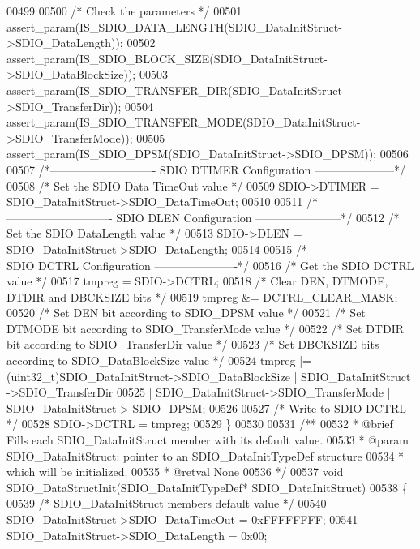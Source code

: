 \begin{DoxyCode}
00499 
00500   \textcolor{comment}{/* Check the parameters */}
00501   assert_param(IS\_SDIO\_DATA\_LENGTH(SDIO\_DataInitStruct->SDIO\_DataLength));
00502   assert_param(IS\_SDIO\_BLOCK\_SIZE(SDIO\_DataInitStruct->SDIO\_DataBlockSize));
00503   assert_param(IS\_SDIO\_TRANSFER\_DIR(SDIO\_DataInitStruct->SDIO\_TransferDir));
00504   assert_param(IS\_SDIO\_TRANSFER\_MODE(SDIO\_DataInitStruct->SDIO\_TransferMode));
00505   assert_param(IS\_SDIO\_DPSM(SDIO\_DataInitStruct->SDIO\_DPSM));
00506 
00507 \textcolor{comment}{/*---------------------------- SDIO DTIMER Configuration ---------------------*/}
00508   \textcolor{comment}{/* Set the SDIO Data TimeOut value */}
00509   SDIO->DTIMER = SDIO\_DataInitStruct->SDIO\_DataTimeOut;
00510 
00511 \textcolor{comment}{/*---------------------------- SDIO DLEN Configuration -----------------------*/}
00512   \textcolor{comment}{/* Set the SDIO DataLength value */}
00513   SDIO->DLEN = SDIO\_DataInitStruct->SDIO\_DataLength;
00514 
00515 \textcolor{comment}{/*---------------------------- SDIO DCTRL Configuration ----------------------*/}
00516   \textcolor{comment}{/* Get the SDIO DCTRL value */}
00517   tmpreg = SDIO->DCTRL;
00518   \textcolor{comment}{/* Clear DEN, DTMODE, DTDIR and DBCKSIZE bits */}
00519   tmpreg &= DCTRL_CLEAR_MASK;
00520   \textcolor{comment}{/* Set DEN bit according to SDIO\_DPSM value */}
00521   \textcolor{comment}{/* Set DTMODE bit according to SDIO\_TransferMode value */}
00522   \textcolor{comment}{/* Set DTDIR bit according to SDIO\_TransferDir value */}
00523   \textcolor{comment}{/* Set DBCKSIZE bits according to SDIO\_DataBlockSize value */}
00524   tmpreg |= (uint32\_t)SDIO\_DataInitStruct->SDIO_DataBlockSize | SDIO\_DataInitStruct
      ->SDIO_TransferDir
00525            | SDIO\_DataInitStruct->SDIO_TransferMode | SDIO\_DataInitStruct->
      SDIO_DPSM;
00526 
00527   \textcolor{comment}{/* Write to SDIO DCTRL */}
00528   SDIO->DCTRL = tmpreg;
00529 \}
00530 
00531 \textcolor{comment}{/**}
00532 \textcolor{comment}{  * @brief  Fills each SDIO\_DataInitStruct member with its default value.}
00533 \textcolor{comment}{  * @param  SDIO\_DataInitStruct: pointer to an SDIO\_DataInitTypeDef structure }
00534 \textcolor{comment}{  *         which will be initialized.}
00535 \textcolor{comment}{  * @retval None}
00536 \textcolor{comment}{  */}
00537 \textcolor{keywordtype}{void} SDIO_DataStructInit(SDIO\_DataInitTypeDef* SDIO\_DataInitStruct)
00538 \{
00539   \textcolor{comment}{/* SDIO\_DataInitStruct members default value */}
00540   SDIO\_DataInitStruct->SDIO_DataTimeOut = 0xFFFFFFFF;
00541   SDIO\_DataInitStruct->SDIO_DataLength = 0x00;

\end{DoxyCode}
